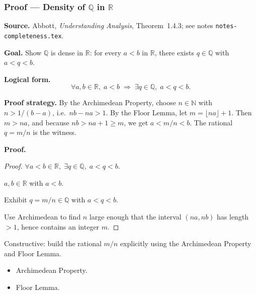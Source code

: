 
\clearpage
{}
\hypertarget{proof-RA-ABB-P-density-Q}{}

\subsubsection[Density of $\mathbb{Q}$ in $\mathbb{R}$]{Proof --- Density of $\mathbb{Q}$ in $\mathbb{R}$}

\bigskip

\noindent
\textbf{Source.}
Abbott, \emph{Understanding Analysis}, Theorem~1.4.3; see notes
\texttt{notes-completeness.tex}.

\vspace{0.75em}

\noindent
\textbf{Goal.}
Show $\mathbb{Q}$ is dense in $\mathbb{R}$:
for every $a < b$ in $\mathbb{R}$, there exists $q \in \mathbb{Q}$ with
$a < q < b$.

\vspace{0.75em}

\noindent
\textbf{Logical form.}
\[
  \forall a, b \in \mathbb{R},\; a < b
  \;\Rightarrow\;
  \exists q \in \mathbb{Q},\; a < q < b.
\]

\vspace{0.75em}

\noindent
\textbf{Proof strategy.}
By the Archimedean Property, choose $n \in \mathbb{N}$ with $n > 1/(b-a)$,
i.e.\ $nb - na > 1$. By the Floor Lemma, let $m = \lfloor na \rfloor + 1$.
Then $m > na$, and because $nb > na + 1 \ge m$, we get $a < m/n < b$.
The rational $q = m/n$ is the witness.

\vspace{0.75em}

\noindent
\textbf{Proof.}
\begin{proof}
\Claim $\forall a < b \in \mathbb{R},\; \exists q \in \mathbb{Q},\; a < q < b$.

\Given $a, b \in \mathbb{R}$ with $a < b$.

\Goal Exhibit $q = m/n \in \mathbb{Q}$ with $a < q < b$.

\Strategy Use Archimedean to find $n$ large enough that the interval
$(na, nb)$ has length $> 1$, hence contains an integer $m$.

\medskip




\end{proof}

\begin{remark*}
Constructive: build the rational $m/n$ explicitly using the Archimedean
Property and Floor Lemma.
\end{remark*}

\begin{remark*}[Dependencies]
\begin{itemize}
  \item Archimedean Property.
  \item Floor Lemma.
\end{itemize}
\end{remark*}
